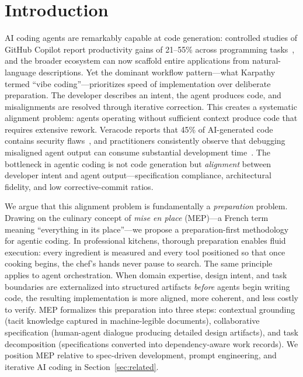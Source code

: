 \section{Introduction}

AI coding agents are remarkably capable at code generation: controlled
studies of GitHub Copilot report productivity gains of 21--55\% across
programming tasks~\cite{peng2023copilot}, and the broader ecosystem can
now scaffold entire applications from natural-language descriptions.
Yet the dominant workflow pattern---what
Karpathy~\cite{karpathy2025vibe} termed ``vibe coding''---prioritizes
speed of implementation over deliberate preparation. The developer
describes an intent, the agent produces code, and misalignments are
resolved through iterative correction. This creates a systematic
alignment problem: agents operating without sufficient context produce
code that requires extensive rework. Veracode reports that 45\% of
AI-generated code contains security flaws~\cite{veracode2025ai}, and
practitioners consistently observe that debugging misaligned agent
output can consume substantial development
time~\cite{huntley2025ralph, yegge2025beads}. The bottleneck in agentic
coding is not code generation but \emph{alignment} between developer
intent and agent output---specification compliance, architectural
fidelity, and low corrective-commit ratios.

We argue that this alignment problem is fundamentally a \emph{preparation}
problem. Drawing on the culinary concept of \emph{mise en place} (MEP)---a
French term meaning ``everything in its place''---we propose a
preparation-first methodology for agentic coding. In professional kitchens,
thorough preparation enables fluid execution: every ingredient is
measured and every tool positioned so that once cooking begins, the
chef's hands never pause to search. The same principle applies to agent
orchestration. When domain expertise, design intent, and task boundaries
are externalized into structured artifacts \emph{before} agents begin
writing code, the resulting implementation is more aligned, more
coherent, and less costly to verify. MEP formalizes this preparation
into three steps: contextual grounding (tacit knowledge captured in
machine-legible documents), collaborative specification (human-agent
dialogue producing detailed design artifacts), and task decomposition
(specifications converted into dependency-aware work records). We
position MEP relative to spec-driven development, prompt engineering,
and iterative AI coding in Section~\ref{sec:related}.

